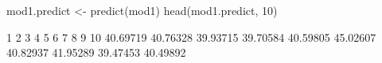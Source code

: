 \begin{Schunk}
\begin{Sinput}
 mod1.predict <- predict(mod1)
 head(mod1.predict, 10)
\end{Sinput}
\begin{Soutput}
       1        2        3        4        5        6        7        8        9       10 
40.69719 40.76328 39.93715 39.70584 40.59805 45.02607 40.82937 41.95289 39.47453 40.49892 
\end{Soutput}
\end{Schunk}
